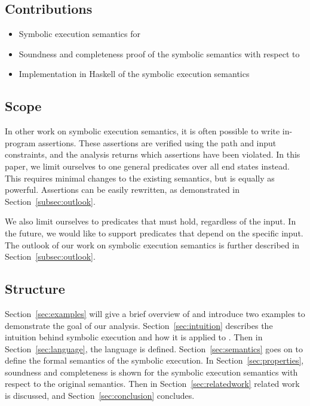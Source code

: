 \subsection{Contributions}

\begin{itemize}
  \item Symbolic execution semantics for \TOPHAT
  \item Soundness and completeness proof of the symbolic semantics with respect to \TOPHAT
  \item Implementation in Haskell of the symbolic execution semantics
\end{itemize}

\subsection{Scope}

In other work on symbolic execution semantics, it is often possible to write in-program assertions.
These assertions are verified using the path and input constraints, and the analysis returns which assertions have been violated.
In this paper, we limit ourselves to one general predicates over all end states instead.
This requires minimal changes to the existing semantics, but is equally as powerful.
Assertions can be easily rewritten, as demonstrated in Section~\ref{subsec:outlook}.

We also limit ourselves to predicates that must hold, regardless of the input.
In the future, we would like to support predicates that depend on the specific input.
The outlook of our work on symbolic execution semantics is further described in Section~\ref{subsec:outlook}.


\subsection{Structure}
Section~\ref{sec:examples} will give a brief overview of \TOPHAT and introduce two examples to demonstrate the goal of our analysis.
Section~\ref{sec:intuition} describes the intuition behind symbolic execution and how it is applied to \TOPHAT.
Then in Section~\ref{sec:language}, the \TOPHAT language is defined.
Section~\ref{sec:semantics} goes on to define the formal semantics of the symbolic execution.
In Section~\ref{sec:properties}, soundness and completeness is shown for the symbolic execution semantics with respect to the original \TOPHAT semantics.
Then in Section~\ref{sec:relatedwork} related work is discussed, and Section~\ref{sec:conclusion} concludes.
